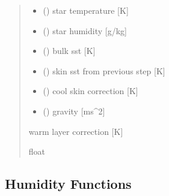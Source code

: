 \documentclass[letterpaper,10pt,english]{sphinxmanual}
\begin{document}
\begin{fulllineitems}
\begin{quote}
\begin{description}
\begin{itemize}
\item {} 
\sphinxAtStartPar
{} () \textendash{} star temperature              {[}K{]}

\item {} 
\sphinxAtStartPar
{} () \textendash{} star humidity                 {[}g/kg{]}

\item {} 
\sphinxAtStartPar
{} () \textendash{} bulk sst                    {[}K{]}

\item {} 
\sphinxAtStartPar
{} () \textendash{} skin sst from previous step {[}K{]}

\item {} 
\sphinxAtStartPar
{} () \textendash{} cool skin correction        {[}K{]}

\item {} 
\sphinxAtStartPar
{} () \textendash{} gravity                      {[}ms\textasciicircum{}\sphinxhyphen{}2{]}

\end{itemize}

\sphinxAtStartPar
{} \textendash{} warm layer correction       {[}K{]}

\sphinxAtStartPar
float

\end{description}\end{quote}

\end{fulllineitems}



\subsection{Humidity Functions}
\label{\detokenize{users_guide:module-hum_subs}}\label{\detokenize{users_guide:humidity-functions}}
\end{document}
